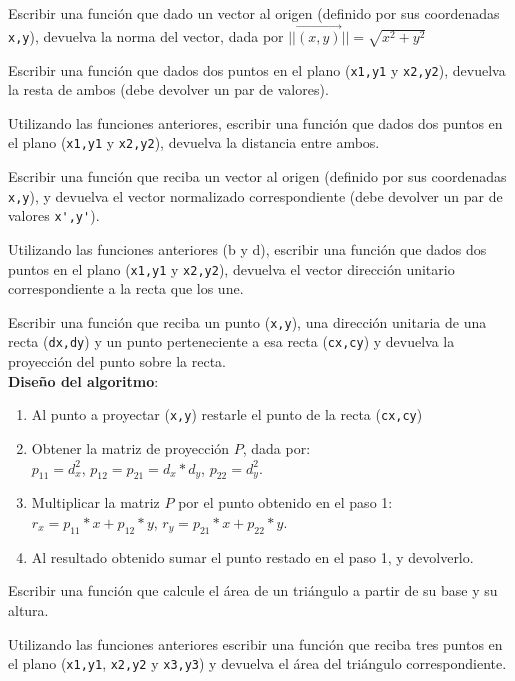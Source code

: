 \begin{partes}
    \item Escribir una función que dado un vector al origen (definido por sus
 coordenadas \verb!x,y!), devuelva la norma del vector, dada por
 $||\vec{(x,y)}||=\sqrt{x^2+y^2}$

    \item Escribir una función que dados dos puntos en el plano (\verb!x1,y1! y
 \verb!x2,y2!), devuelva la resta de ambos (debe devolver un par de
 valores).

    \item Utilizando las funciones anteriores, escribir una función que dados dos
 puntos en el plano (\verb!x1,y1! y \verb!x2,y2!), devuelva la distancia
 entre ambos.

    \item Escribir una función que reciba un vector al origen (definido por sus
 coordenadas \verb!x,y!), y devuelva el vector normalizado correspondiente (debe
 devolver un par de valores \verb!x',y'!).

    \item Utilizando las funciones anteriores (b y d), escribir una función que
 dados dos puntos en el plano (\verb!x1,y1! y \verb!x2,y2!), devuelva el
 vector dirección unitario correspondiente a la recta que los une.

    \item Escribir una función que reciba un punto (\verb!x,y!), una dirección
 unitaria de una recta (\verb!dx,dy!) y un punto perteneciente a esa recta
 (\verb!cx,cy!) y devuelva la proyección del punto sobre la recta. \\
 {\bf Diseño del algoritmo}:
 \begin{enumerate}
     \setlength{\itemsep}{0pt}
     \setlength{\parsep}{0pt}
     \item Al punto a proyectar (\verb!x,y!) restarle el punto de la recta
 (\verb!cx,cy!)
     \item Obtener la matriz de proyección $P$, dada por:  \\
 $p_{11} = d_x^2$,  $p_{12} = p_{21} = d_x*d_y$, $p_{22} = d_y^2$.
     \item Multiplicar la matriz $P$ por el punto obtenido en el paso 1: \\
 $r_x = p_{11} * x + p_12 * y$, $r_y = p_{21} * x + p_{22} * y$.
     \item Al resultado obtenido sumar el punto restado en el paso 1, y
 devolverlo.
 \end{enumerate}

    \item Escribir una función que calcule el área de un triángulo a partir de
 su base y su altura.

    \item Utilizando las funciones anteriores escribir una función que reciba
 tres puntos en el plano (\verb!x1,y1!, \verb!x2,y2! y \verb!x3,y3!) y
 devuelva el área del triángulo correspondiente.
\end{partes}
